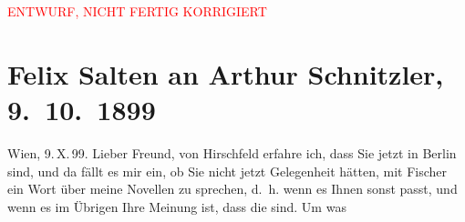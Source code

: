 
\begin{center}
            \textcolor{red}{ENTWURF, NICHT FERTIG KORRIGIERT}
                      \end{center}
            
         
         \renewcommand{\erwaehntePersonen}{Personen: Samuel Fischer, Georg Hirschfeld}
         \renewcommand{\erwaehnteInstitutionen}{Institutionen: S. Fischer Verlag, Volkstheater}
         \renewcommand{\erwaehnteOrte}{Orte: Berlin, Wien}
         \renewcommand{\erwaehnteWerke}{Werke: Der Hinterbliebene. Kurze Novellen, Schöne Seelen. Komödie in einem Akt}
               \section[Felix Salten an Arthur Schnitzler, 9. 10. 1899]{ Felix Salten an Arthur Schnitzler, 9. 10. 1899}\nopagebreak{}\rehead{ }\begin{ledgroupsized}[t]{13cm}\normalsize\beginnumbering \toendnotes[C]{\smallbreak\pagebreak[2]} 
\toendnotes[C]{\smallbreak}\pstart
           \raggedleft{}{\pb}Wien, 9. X. 99. \pend
           \pstart
           Lieber Freund, von Hirschfeld erfahre
               ich, dass Sie jetzt in Berlin sind, und da fällt
               es mir ein, ob Sie nicht jetzt Gelegenheit hätten, mit Fischer ein Wort über meine Novellen zu sprechen, d. h. wenn es Ihnen sonst passt,
               und wenn es im Übrigen Ihre Meinung ist, dass die \label{K_L03301-1v}\label{K_L03301-1h} sind. Um was

\end{ledgroupsized}

